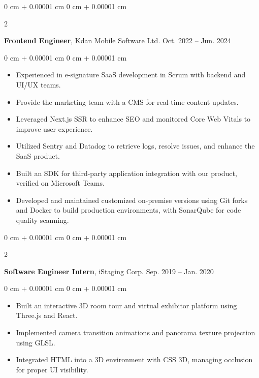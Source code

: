 \documentclass[10pt, letterpaper]{article}
\newenvironment{highlights}{
    \begin{itemize}[
        topsep=0.10 cm,
        parsep=0.10 cm,
        partopsep=0pt,
        itemsep=0pt,
        leftmargin=0 cm + 10pt
    ]
}{
    \end{itemize}
} %
\newenvironment{onecolentry}{
    \begin{adjustwidth}{
        0 cm + 0.00001 cm
    }{
        0 cm + 0.00001 cm
    }
}{
    \end{adjustwidth}
} %
\newenvironment{twocolentry}[2][]{
    \onecolentry
    \def\secondColumn{#2}
    \setcolumnwidth{\fill, 4.5 cm}
    \begin{paracol}{2}
}{
    \switchcolumn \raggedleft \secondColumn
    \end{paracol}
    \endonecolentry
} %
\begin{document}
        \vspace{0.2 cm}

        \begin{twocolentry}{
            Oct. 2022 – Jun. 2024
        }
            \textbf{Frontend Engineer}, Kdan Mobile Software Ltd.\end{twocolentry}

        \vspace{0.10 cm}
        \begin{onecolentry}
            \begin{highlights}
                \item Experienced in e-signature SaaS development in Scrum with backend and UI/UX teams.
                \item Provide the marketing team with a CMS for real-time content updates.
                \item Leveraged Next.js SSR to enhance SEO and monitored Core Web Vitals to improve user experience.
                \item Utilized Sentry and Datadog to retrieve logs, resolve issues, and enhance the SaaS product.
                \item Built an SDK for third-party application integration with our product, verified on Microsoft Teams.
                \item Developed and maintained customized on-premise versions using Git forks and Docker to build production environments, with SonarQube for code quality scanning.
            \end{highlights}
        \end{onecolentry}

        \vspace{0.2 cm}

        \begin{twocolentry}{
            Sep. 2019 – Jan. 2020
        }
            \textbf{Software Engineer Intern}, iStaging Corp.\end{twocolentry}

        \vspace{0.10 cm}
        \begin{onecolentry}
            \begin{highlights}
                \item Built an interactive 3D room tour and virtual exhibitor platform using Three.js and React.
                \item Implemented camera transition animations and panorama texture projection using GLSL.
                \item Integrated HTML into a 3D environment with CSS 3D, managing occlusion for proper UI visibility.
            \end{highlights}
        \end{onecolentry}
\end{document}

